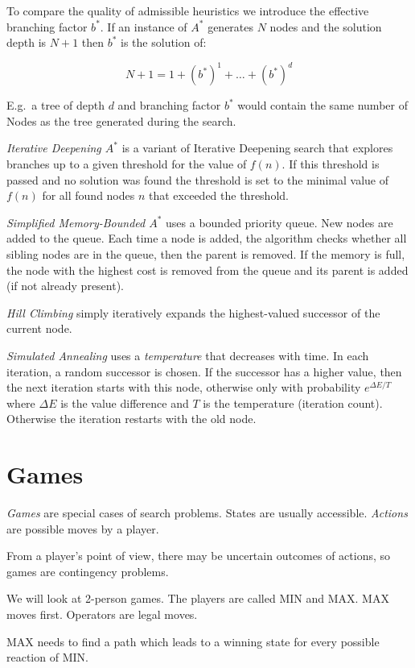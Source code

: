 \documentclass[english]{panikzettel}
\begin{document}
To compare the quality of admissible heuristics we introduce the effective branching factor $b^\ast$. If an instance of $A^\ast$ generates $N$ nodes and the solution depth is $N+1$ then $b^\ast$ is the solution of:

\[N+1 = 1 + \left(b^\ast \right)^1  + \dots + \left(b^\ast\right)^d\]

E.g.\ a tree of depth $d$ and branching factor $b^\ast$ would contain the same number of Nodes as the tree generated during the search.

\emph{Iterative Deepening $A^\ast$} is a variant of Iterative Deepening search that explores branches up to a given threshold for the value of $f(n)$. If this threshold is passed and no solution was found the threshold is set to the minimal value of $f(n)$ for all found nodes $n$ that exceeded the threshold.

\emph{Simplified Memory-Bounded $A^\ast$} uses a bounded priority queue. New nodes are added to the queue.
Each time a node is added, the algorithm checks whether all sibling nodes are in the queue, then the parent is removed.
If the memory is full, the node with the highest cost is removed from the queue and its parent is added (if not already present).

\emph{Hill Climbing} simply iteratively expands the highest-valued successor of the current node.

\emph{Simulated Annealing} uses a \emph{temperature} that decreases with time. In each iteration, a random successor is chosen.
If the successor has a higher value, then the next iteration starts with this node, otherwise only with probability $e^{\Delta E / T}$ where $\Delta E$ is the value difference and $T$ is the temperature (iteration count).
Otherwise the iteration restarts with the old node.

\newpage
\section{Games}

\emph{Games} are special cases of search problems.
States are usually accessible.
\emph{Actions} are possible moves by a player.

From a player's point of view, there may be uncertain outcomes of actions, so games are contingency problems.

We will look at 2-person games.
The players are called MIN and MAX.
MAX moves first.
Operators are legal moves.

MAX needs to find a path which leads to a winning state for every possible reaction of MIN.
\end{document}
